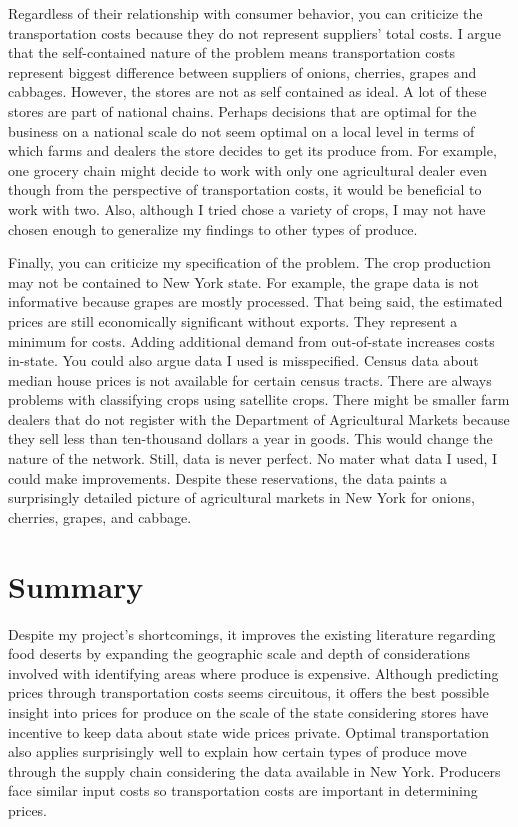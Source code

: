 \documentclass{report}
\begin{document}
Regardless of their relationship with consumer behavior, you can criticize the transportation costs because they do not represent suppliers' total costs. I argue that the self-contained nature of the problem means transportation costs represent biggest difference between suppliers of onions, cherries, grapes and cabbages. However, the stores are not as self contained as ideal. A lot of these stores are part of national chains. Perhaps decisions that are optimal for the business on a national scale do not seem optimal on a local level in terms of which farms and dealers the store decides to get its produce from. For example, one grocery chain might decide to work with only one agricultural dealer even though from the perspective of transportation costs, it would be beneficial to work with two. Also, although I tried chose a variety of crops, I may not have chosen enough to generalize my findings to other types of produce.

Finally, you can criticize my specification of the problem. The crop production may not be contained to New York state. For example, the grape data is not informative because grapes are mostly processed. That being said, the estimated prices are still economically significant without exports. They represent a minimum for costs. Adding additional demand from out-of-state increases costs in-state. You could also argue data I used is misspecified. Census data about median house prices is not available for certain census tracts. There are always problems with classifying crops using satellite crops. There might be smaller farm dealers that do not register with the Department of Agricultural Markets because they sell less than ten-thousand dollars a year in goods. This would change the nature of the network. Still, data is never perfect. No mater what data I used, I could make improvements. Despite these reservations, the data paints a surprisingly detailed picture of agricultural markets in New York for onions, cherries, grapes, and cabbage. 


\section{Summary}

Despite my project's shortcomings, it improves the existing literature regarding food deserts by expanding the geographic scale and depth of considerations involved with identifying areas where produce is expensive. Although predicting prices through transportation costs seems circuitous, it offers the best possible insight into prices for produce on the scale of the state considering stores have incentive to keep data about state wide prices private. Optimal transportation also applies surprisingly well to explain how certain types of produce move through the supply chain considering the data available in New York. Producers face similar input costs so transportation costs are important in determining prices.
\end{document}
